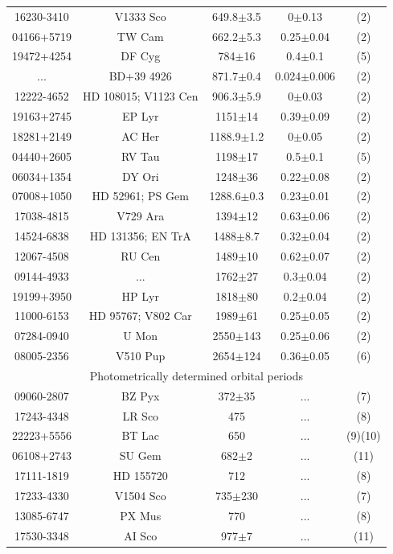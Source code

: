 \begin{table}
\begin{tabular}{c c c c c}
16230-3410 & V1333 Sco & 649.8$\pm$3.5 & 0$\pm$0.13 & (2) \\
04166+5719 & TW Cam & 662.2$\pm$5.3 & 0.25$\pm$0.04 & (2) \\
19472+4254 & DF Cyg & 784$\pm$16 & 0.4$\pm$0.1 & (5) \\
... & BD+39 4926 & 871.7$\pm$0.4 & 0.024$\pm$0.006 & (2) \\
12222-4652 & HD 108015; V1123 Cen & 906.3$\pm$5.9 & 0$\pm$0.03 & (2) \\
19163+2745 & EP Lyr & 1151$\pm$14 & 0.39$\pm$0.09 & (2) \\
18281+2149 & AC Her & 1188.9$\pm$1.2 & 0$\pm$0.05 & (2) \\
04440+2605 & RV Tau & 1198$\pm$17 & 0.5$\pm$0.1 & (5) \\
06034+1354 & DY Ori & 1248$\pm$36 & 0.22$\pm$0.08 & (2) \\
07008+1050 & HD 52961; PS Gem & 1288.6$\pm$0.3 & 0.23$\pm$0.01 & (2) \\
17038-4815 & V729 Ara & 1394$\pm$12 & 0.63$\pm$0.06 & (2) \\
14524-6838 & HD 131356; EN TrA & 1488$\pm$8.7 & 0.32$\pm$0.04 & (2) \\
12067-4508 & RU Cen & 1489$\pm$10 & 0.62$\pm$0.07 & (2) \\
09144-4933 & ... & 1762$\pm$27 & 0.3$\pm$0.04 & (2) \\
19199+3950 & HP Lyr & 1818$\pm$80 & 0.2$\pm$0.04 & (2) \\
11000-6153 & HD 95767; V802 Car & 1989$\pm$61 & 0.25$\pm$0.05 & (2) \\
07284-0940 & U Mon & 2550$\pm$143 & 0.25$\pm$0.06 & (2) \\
08005-2356 & V510 Pup & 2654$\pm$124 & 0.36$\pm$0.05 & (6) \\
\hline
\multicolumn{5}{c}{Photometrically determined orbital periods} \\
\hline
09060-2807 & BZ Pyx & 372$\pm$35 & ... & (7) \\
17243-4348 & LR Sco & 475 & ... & (8) \\
22223+5556 & BT Lac & 650 & ... & (9)(10) \\
06108+2743 & SU Gem & 682$\pm$2 & ... & (11) \\
17111-1819 & HD 155720 & 712 & ... & (8) \\
17233-4330 & V1504 Sco & 735$\pm$230 & ... & (7) \\
13085-6747 & PX Mus & 770 & ... & (8) \\
17530-3348 & AI Sco & 977$\pm$7 & ... & (11) \\

\end{tabular}
\end{table}
